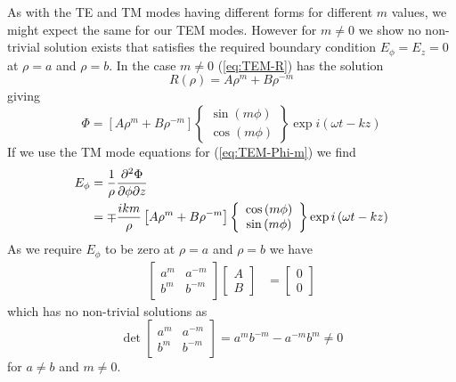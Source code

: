 \documentclass[twoside, a4paper]{article}
\begin{document}
As with the TE and TM modes having different forms for different $m$ values, we might expect the same for our TEM modes. However for $m \neq 0$ we show no non-trivial solution exists that satisfies the required boundary condition \mbox{$E_\phi = E_z = 0$} at $\rho=a$ and $\rho=b$. In the case $m \neq 0$ (\ref{eq:TEM-R}) has the solution
\begin{equation*}
R \left( \rho \right) = A \rho^m + B \rho^{-m}
\end{equation*}
giving
\begin{equation}
\label{eq:TEM-Phi-m}
\Phi = \left[ A\rho^m + B\rho^{-m}\right]
	\left\{
	\begin{array}{c}
		\sin \left( m \phi \right) \\
		\cos \left( m \phi \right)
	\end{array}
	\right\}
	\exp i \left( \omega t - k z \right)
\end{equation}
If we use the TM mode equations for (\ref{eq:TEM-Phi-m}) we find
\begin{align*}
E_\phi	& = \frac{1}{\rho} \frac{\partial^2 \Phi}{\partial \phi \partial z} \\
		& = \mp \frac{i k m}{\rho} \left[ A \rho^m + B \rho^{-m} \right]
			\left\{
			\begin{array}{c}
			\cos \left( m \phi \right) \\
			\sin \left( m \phi \right)
			\end{array}
			\right\}
			\exp i \left( \omega t - k z \right)
\end{align*}
As we require $E_\phi$ to be zero at $\rho = a$ and $\rho = b$ we have
\begin{align*}
\left[
\begin{array}{cc}
a^m 	& a^{-m} \\
b^m		& b^{-m}
\end{array}
\right]
\left[
\begin{array}{c}
A \\
B
\end{array}
\right]
& =
\left[
\begin{array}{c}
0 \\
0
\end{array}
\right]
\end{align*}
which has no non-trivial solutions as 
\begin{equation*}
\det
\left[
\begin{array}{cc}
a^m 	& a^{-m} \\
b^m		& b^{-m}
\end{array}
\right]
= a^m b^{-m} - a^{-m}b^m
\neq 0
\end{equation*}
for $a \neq b$ and $m \neq 0$.
\end{document}
